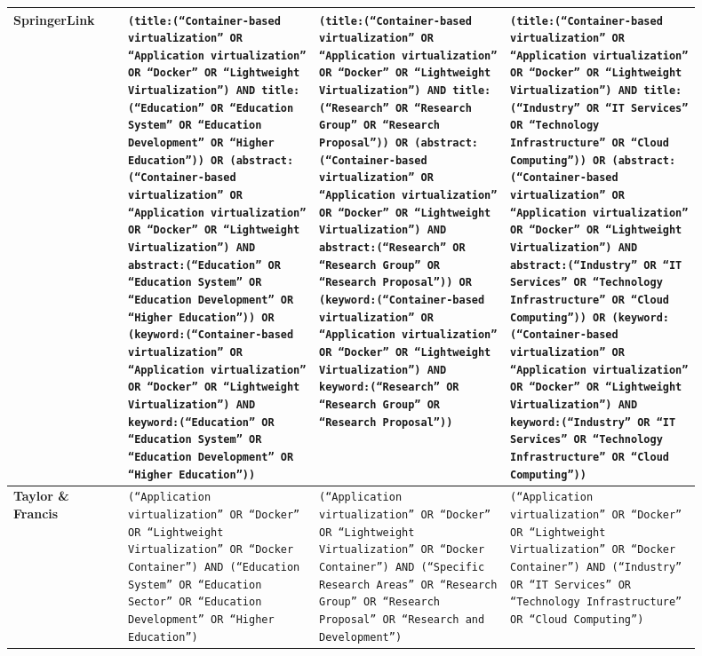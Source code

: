 \begin{table}[htbp]
\begin{adjustbox}{max width=\textwidth}
\begin{tabular}{|P{0.15\linewidth}|P{0.25\linewidth}|P{0.25\linewidth}|P{0.25\linewidth}|}
\textbf{SpringerLink} 
& \tiny \texttt{(title:(``Container-based virtualization'' OR ``Application virtualization'' OR ``Docker'' OR ``Lightweight Virtualization'') AND title:(``Education'' OR ``Education System'' OR ``Education Development'' OR ``Higher Education'')) OR (abstract:(``Container-based virtualization'' OR ``Application virtualization'' OR ``Docker'' OR ``Lightweight Virtualization'') AND abstract:(``Education'' OR ``Education System'' OR ``Education Development'' OR ``Higher Education'')) OR (keyword:(``Container-based virtualization'' OR ``Application virtualization'' OR ``Docker'' OR ``Lightweight Virtualization'') AND keyword:(``Education'' OR ``Education System'' OR ``Education Development'' OR ``Higher Education''))} 
& \tiny \texttt{(title:(``Container-based virtualization'' OR ``Application virtualization'' OR ``Docker'' OR ``Lightweight Virtualization'') AND title:(``Research'' OR ``Research Group'' OR ``Research Proposal'')) OR (abstract:(``Container-based virtualization'' OR ``Application virtualization'' OR ``Docker'' OR ``Lightweight Virtualization'') AND abstract:(``Research'' OR ``Research Group'' OR ``Research Proposal'')) OR (keyword:(``Container-based virtualization'' OR ``Application virtualization'' OR ``Docker'' OR ``Lightweight Virtualization'') AND keyword:(``Research'' OR ``Research Group'' OR ``Research Proposal''))} 
& \tiny \texttt{(title:(``Container-based virtualization'' OR ``Application virtualization'' OR ``Docker'' OR ``Lightweight Virtualization'') AND title:(``Industry'' OR ``IT Services'' OR ``Technology Infrastructure'' OR ``Cloud Computing'')) OR (abstract:(``Container-based virtualization'' OR ``Application virtualization'' OR ``Docker'' OR ``Lightweight Virtualization'') AND abstract:(``Industry'' OR ``IT Services'' OR ``Technology Infrastructure'' OR ``Cloud Computing'')) OR (keyword:(``Container-based virtualization'' OR ``Application virtualization'' OR ``Docker'' OR ``Lightweight Virtualization'') AND keyword:(``Industry'' OR ``IT Services'' OR ``Technology Infrastructure'' OR ``Cloud Computing''))} \\
\hline

\textbf{Taylor \& Francis} 
& \tiny \texttt{(``Application virtualization'' OR ``Docker'' OR ``Lightweight Virtualization'' OR ``Docker Container'') AND (``Education System'' OR ``Education Sector'' OR ``Education Development'' OR ``Higher Education'')} 
& \tiny \texttt{(``Application virtualization'' OR ``Docker'' OR ``Lightweight Virtualization'' OR ``Docker Container'') AND (``Specific Research Areas'' OR ``Research Group'' OR ``Research Proposal'' OR ``Research and Development'')} 
& \tiny \texttt{(``Application virtualization'' OR ``Docker'' OR ``Lightweight Virtualization'' OR ``Docker Container'') AND (``Industry'' OR ``IT Services'' OR ``Technology Infrastructure'' OR ``Cloud Computing'')} \\
\hline


\end{tabular}
\end{adjustbox}
\end{table}
